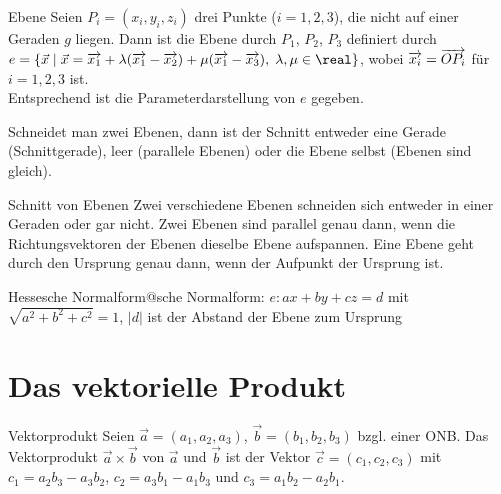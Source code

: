 \begin{Def}{Ebene}
    Seien $P_i = (x_i, y_i, z_i)$ drei Punkte ($i = 1, 2, 3$), die nicht auf
    einer Geraden $g$ liegen.
    Dann ist die Ebene durch $P_1$, $P_2$, $P_3$ definiert durch \\
    $e = \{\vec{x} \;|\; \vec{x} = \vektor{x_1} +
    \lambda (\vektor{x_1} - \vektor{x_2}) +
    \mu (\vektor{x_1} - \vektor{x_3}),\; \lambda, \mu \in \real\}$, wobei
    $\overrightarrow{x_i} = \overrightarrow{OP_i}$ für $i = 1, 2, 3$ ist. \\
    Entsprechend ist die Parameterdarstellung von $e$ gegeben.
\end{Def}

\begin{Bem}
    Schneidet man zwei Ebenen, dann ist der Schnitt entweder eine Gerade
    (Schnittgerade), leer (parallele Ebenen) oder die Ebene selbst (Ebenen
    sind gleich).
\end{Bem}

\begin{Satz}{Schnitt von Ebenen}
    Zwei verschiedene Ebenen schneiden sich entweder in einer Geraden oder gar
    nicht.
    Zwei Ebenen sind parallel genau dann, wenn die Richtungsvektoren
    der Ebenen dieselbe Ebene aufspannen.
    Eine Ebene geht durch den Ursprung genau dann, wenn der Aufpunkt der
    Ursprung ist.
\end{Satz}

\begin{Bem}
    {Hessesche Normalform@sche Normalform}: $e: ax + by + cz = d$
    mit $\sqrt{a^2 + b^2 + c^2} = 1$, $|d|$ ist der Abstand der Ebene zum
    Ursprung
\end{Bem}

\section{%
    Das vektorielle Produkt%
}

\begin{Def}{Vektorprodukt}
    Seien $\vec{a} = (a_1, a_2, a_3)$, $\vec{b} = (b_1, b_2, b_3)$ bzgl.
    einer ONB.
    Das Vektorprodukt $\vec{a} \times \vec{b}$ von $\vec{a}$ und $\vec{b}$ ist
    der Vektor $\vec{c} = (c_1, c_2, c_3)$ mit
    $c_1 = a_2 b_3 - a_3 b_2$, $c_2 = a_3 b_1 - a_1 b_3$ und
    $c_3 = a_1 b_2 - a_2 b_1$.
\end{Def}

